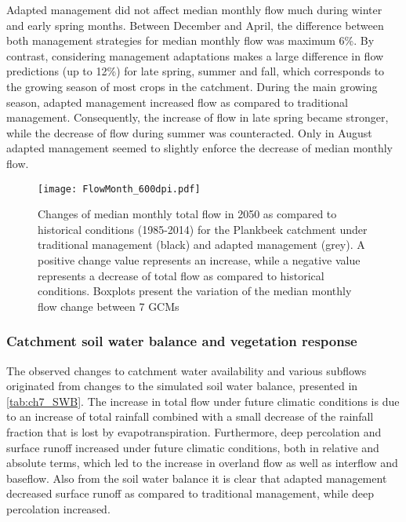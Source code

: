 Adapted management did not affect median monthly flow much during winter and early spring  months. Between December and April, the difference between both management strategies for median monthly flow was maximum 6\%. By contrast, considering management adaptations makes a large difference in flow predictions (up to 12\%)  for late spring, summer and fall, which corresponds to the growing season of most crops in the catchment. During the main growing season, adapted management increased flow as compared to traditional management. Consequently, the increase of flow in late spring became stronger, while the decrease of flow during summer was counteracted. Only in August adapted management seemed to slightly enforce the decrease of median monthly flow. 


\begin{figure}[tbhp]
	\centering
		\texttt{[image: FlowMonth\_600dpi.pdf]}
	\caption{Changes of  median monthly total flow in 2050 as compared to historical conditions (1985-2014) for the Plankbeek catchment under traditional management (black) and adapted management (grey). A positive change value represents an increase, while a negative value represents a decrease of total flow as compared to historical conditions. Boxplots present the variation of the median monthly flow change between 7 GCMs}
	\label{fig:ch7_FlowMonth}
\end{figure}   

\subsubsection{Catchment soil water balance and vegetation response}
The observed changes to catchment water availability and various subflows originated from changes to the simulated soil water balance, presented in \autoref{tab:ch7_SWB}. The increase in total flow under future climatic conditions is due to an increase of total rainfall combined with a small decrease of the rainfall fraction that is lost by evapotranspiration. Furthermore, deep percolation and surface runoff increased under future climatic conditions, both in relative and absolute terms, which led to the increase in overland flow as well as interflow and baseflow. Also from the soil water balance it is clear that adapted management decreased surface runoff as compared to traditional management, while deep percolation increased. 

